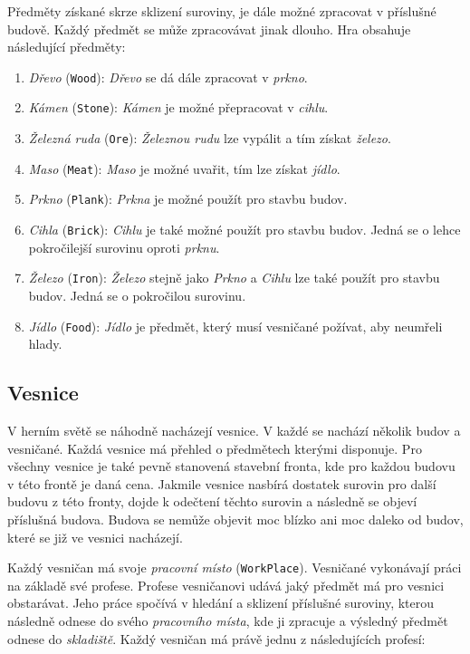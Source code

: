 Předměty získané skrze sklizení suroviny, je dále možné zpracovat v příslušné budově. Každý předmět se může zpracovávat jinak dlouho. Hra obsahuje následující předměty:

\begin{enumerate}
    \item \textit{Dřevo} (\verb|Wood|): \textit{Dřevo} se dá dále zpracovat v \textit{prkno}.
    \item \textit{Kámen} (\verb|Stone|): \textit{Kámen} je možné přepracovat v \textit{cihlu}.
    \item \textit{Železná ruda} (\verb|Ore|): \textit{Železnou rudu} lze vypálit a tím získat \textit{železo}.
    \item \textit{Maso} (\verb|Meat|): \textit{Maso} je možné uvařit, tím lze získat \textit{jídlo}.
    \item \textit{Prkno} (\verb|Plank|): \textit{Prkna} je možné použít pro stavbu budov.
    \item \textit{Cihla} (\verb|Brick|): \textit{Cihlu} je také možné použít pro stavbu budov. Jedná se o lehce pokročilejší surovinu oproti \textit{prknu}.
    \item \textit{Železo} (\verb|Iron|): \textit{Železo} stejně jako \textit{Prkno} a \textit{Cihlu} lze také použít pro stavbu budov. Jedná se o pokročilou surovinu.
    \item \textit{Jídlo} (\verb|Food|): \textit{Jídlo} je předmět, který musí vesničané požívat, aby neumřeli hlady.
\end{enumerate}

\subsection{Vesnice}
\label{subsec:villages}
V herním světě se náhodně nacházejí vesnice. V každé se nachází několik budov a vesničané. Každá vesnice má přehled o předmětech kterými disponuje. Pro všechny vesnice je také pevně stanovená stavební fronta, kde pro každou budovu v této frontě je daná cena. Jakmile vesnice nasbírá dostatek surovin pro další budovu z této fronty, dojde k odečtení těchto surovin a následně se objeví příslušná budova. Budova se nemůže objevit moc blízko ani moc daleko od budov, které se již ve vesnici nacházejí.

Každý vesničan má svoje \textit{pracovní místo} (\verb|WorkPlace|). Vesničané vykonávají práci na základě své profese. Profese vesničanovi udává jaký předmět má pro vesnici obstarávat. Jeho práce spočívá v hledání a sklizení příslušné suroviny, kterou následně odnese do svého \textit{pracovního místa}, kde ji zpracuje a výsledný předmět odnese do \textit{skladiště}. Každý vesničan má právě jednu z následujících profesí:

